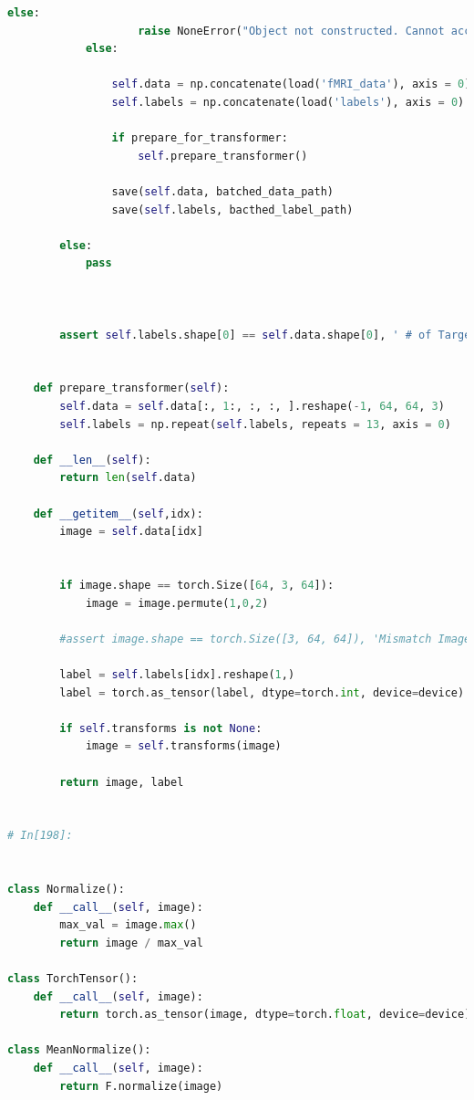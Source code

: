 \documentclass[10pt, twocolumn, letterpaper]{article}
\begin{document}
\begin{lstlisting}[language=Python]
                else:
                    raise NoneError("Object not constructed. Cannot access a 'None' object.")
            else:
                              
                self.data = np.concatenate(load('fMRI_data'), axis = 0)
                self.labels = np.concatenate(load('labels'), axis = 0)
                
                if prepare_for_transformer:
                    self.prepare_transformer()
                    
                save(self.data, batched_data_path)
                save(self.labels, bacthed_label_path)                                    
            
        else:
            pass
                   

        
        assert self.labels.shape[0] == self.data.shape[0], ' # of Targets and Data samples does not match!'
            
    
    def prepare_transformer(self):
        self.data = self.data[:, 1:, :, :, ].reshape(-1, 64, 64, 3)                         
        self.labels = np.repeat(self.labels, repeats = 13, axis = 0)
      
    def __len__(self):
        return len(self.data)
    
    def __getitem__(self,idx):
        image = self.data[idx]
               
        
        if image.shape == torch.Size([64, 3, 64]):
            image = image.permute(1,0,2)
                 
        #assert image.shape == torch.Size([3, 64, 64]), 'Mismatch Image Dimension!'
            
        label = self.labels[idx].reshape(1,)
        label = torch.as_tensor(label, dtype=torch.int, device=device)
  
        if self.transforms is not None:
            image = self.transforms(image)
          
        return image, label     


# In[198]:


class Normalize():
    def __call__(self, image):
        max_val = image.max()
        return image / max_val
    
class TorchTensor():
    def __call__(self, image):
        return torch.as_tensor(image, dtype=torch.float, device=device)
        
class MeanNormalize(): 
    def __call__(self, image):
        return F.normalize(image)
    

\end{lstlisting}
\end{document}

